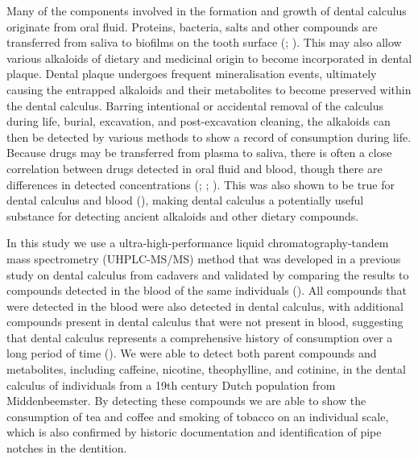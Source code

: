 \documentclass[
  11pt,
  leqno]{scrartcl}
\begin{document}
Many of the components involved in the formation and growth of dental
calculus originate from oral fluid. Proteins, bacteria, salts and other
compounds are transferred from saliva to biofilms on the tooth surface
(;
). This may
also allow various alkaloids of dietary and medicinal origin to become
incorporated in dental plaque. Dental plaque undergoes frequent
mineralisation events, ultimately causing the entrapped alkaloids and
their metabolites to become preserved within the dental calculus.
Barring intentional or accidental removal of the calculus during life,
burial, excavation, and post-excavation cleaning, the alkaloids can then
be detected by various methods to show a record of consumption during
life. Because drugs may be transferred from plasma to saliva, there is
often a close correlation between drugs detected in oral fluid and
blood, though there are differences in detected concentrations
(;
;
). This was also
shown to be true for dental calculus and blood
(),
making dental calculus a potentially useful substance for detecting
ancient alkaloids and other dietary compounds.

In this study we use a ultra-high-performance liquid
chromatography-tandem mass spectrometry (UHPLC-MS/MS) method that was
developed in a previous study on dental calculus from cadavers and
validated by comparing the results to compounds detected in the blood of
the same individuals (). All compounds that were detected in the blood were also
detected in dental calculus, with additional compounds present in dental
calculus that were not present in blood, suggesting that dental calculus
represents a comprehensive history of consumption over a long period of
time ().
We were able to detect both parent compounds and metabolites, including
caffeine, nicotine, theophylline, and cotinine, in the dental calculus
of individuals from a 19th century Dutch population from Middenbeemster.
By detecting these compounds we are able to show the consumption of tea
and coffee and smoking of tobacco on an individual scale, which is also
confirmed by historic documentation and identification of pipe notches
in the dentition.
\end{document}
